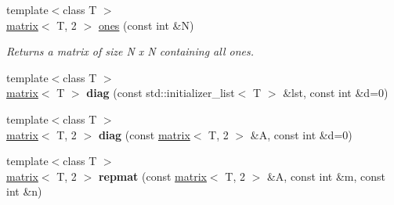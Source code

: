 \begin{DoxyCompactItemize}
{\footnotesize template$<$class T $>$ }\\\hyperlink{classkeycpp_1_1matrix}{matrix}$<$ T, 2 $>$ \hyperlink{namespacekeycpp_a49b117efdb07f136f72534b65952c167}{ones} (const int \&N)
\begin{DoxyCompactList}\small\item\em Returns a matrix of size N x N containing all ones. \end{DoxyCompactList}\item 
\hypertarget{namespacekeycpp_a4bb3ea9a842383b82c889179f25be9ec}{{\footnotesize template$<$class T $>$ }\\\hyperlink{classkeycpp_1_1matrix}{matrix}$<$ T $>$ {\bfseries diag} (const std\-::initializer\-\_\-list$<$ T $>$ \&lst, const int \&d=0)}\label{namespacekeycpp_a4bb3ea9a842383b82c889179f25be9ec}

\item 
\hypertarget{namespacekeycpp_abb22f2e817f5a19a8547f446d48855b6}{{\footnotesize template$<$class T $>$ }\\\hyperlink{classkeycpp_1_1matrix}{matrix}$<$ T, 2 $>$ {\bfseries diag} (const \hyperlink{classkeycpp_1_1matrix}{matrix}$<$ T, 2 $>$ \&A, const int \&d=0)}\label{namespacekeycpp_abb22f2e817f5a19a8547f446d48855b6}

\item 
\hypertarget{namespacekeycpp_a7dec07979cca186806a17250b2cb50aa}{{\footnotesize template$<$class T $>$ }\\\hyperlink{classkeycpp_1_1matrix}{matrix}$<$ T, 2 $>$ {\bfseries repmat} (const \hyperlink{classkeycpp_1_1matrix}{matrix}$<$ T, 2 $>$ \&A, const int \&m, const int \&n)}\label{namespacekeycpp_a7dec07979cca186806a17250b2cb50aa}


\end{DoxyCompactItemize}
